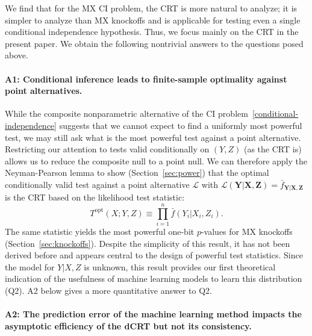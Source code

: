 \documentclass[ejs]{imsart}
\numberwithin{equation}{section}
\theoremstyle{plain}
\theoremstyle{definition}
\theoremstyle{remark}
\newcommand{\prx}{\bm X}
\newcommand{\srx}{X}
\newcommand{\prz}{\bm Z}
\newcommand{\srz}{Z}
\newcommand{\pry}{{\bm Y}}
\newcommand{\sry}{Y}
\begin{document}
We find that for the MX CI problem, the CRT is more natural to analyze; it is simpler to analyze than MX knockoffs and is applicable for testing even a single conditional independence hypothesis. Thus, we focus mainly on the CRT in the present paper. We obtain the following nontrivial answers to the questions posed above.

\paragraph{A1: Conditional inference leads to finite-sample optimality against point alternatives.}

While the composite nonparametric alternative of the CI problem~\eqref{conditional-independence} suggests that we cannot expect to find a uniformly most powerful test, we may still ask what is the most powerful test against a point alternative. Restricting our attention to tests valid conditionally on $(\sry, \srz)$ (as the CRT is) allows us to reduce the composite null to a point null. We can therefore apply the Neyman-Pearson lemma to show (Section~\ref{sec:power}) that the optimal conditionally valid test against a point alternative $\mathcal L$ with $\mathcal L(\pry|\prx,\prz) = \bar f_{\pry|\prx,\prz}$ is the CRT based on the likelihood test statistic:
\begin{equation}
	T^{\text{opt}}(\srx; \sry, \srz) \equiv \prod_{i = 1}^n \bar f(\sry_i|\srx_i, \srz_i).
\end{equation}
The same statistic yields the most powerful one-bit $p$-values for MX knockoffs (Section~\ref{sec:knockoffs}). Despite the simplicity of this result, it has not been derived before and appears central to the design of powerful test statistics. Since the model for $Y|X,Z$ is unknown, this result provides our first theoretical indication of the usefulness of machine learning models to learn this distribution (Q2). A2 below gives a more quantitative answer to Q2.

\paragraph{A2: The prediction error of the machine learning method impacts the asymptotic efficiency of the dCRT but not its consistency.}
\end{document}
